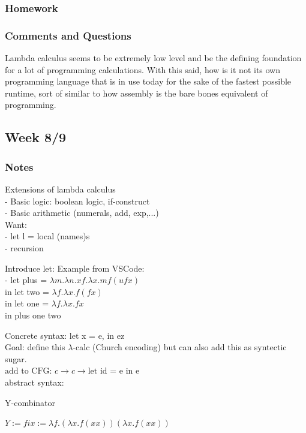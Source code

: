 \documentclass{article}
\theoremstyle{theorem}
\theoremstyle{definition}
\theoremstyle{remark}
\begin{document}
\subsubsection*{Homework}

\subsubsection*{Comments and Questions}

Lambda calculus seems to be extremely low level and be the defining foundation for a lot of programming calculations. With this said, how is it not its own programming language that is in use today for the sake of the fastest possible runtime, sort of similar to how assembly is the bare bones equivalent of programming.

\subsection{Week 8/9}

\subsubsection*{Notes}

Extensions of lambda calculus \\ 
- Basic logic: boolean logic, if-construct \\
- Basic arithmetic (numerals, add, exp,...) \\
Want: \\ 
- let l = local (names)s \\
- recursion

Introduce let:
Example from VSCode: \\
- let plus = $\lambda m . \lambda n.xf.\lambda x. m f(u f x)$ \\
  in let two = $\lambda f.\lambda x.f(fx)$ \\
  in let one = $\lambda f.\lambda x.fx$ \\
  in plus one two

Concrete syntax: let x = e, in ez \\
Goal: define this $\lambda$-calc (Church encoding)  but can also add this as syntectic sugar. \\
$\text{add to CFG: } c \rightarrow c \rightarrow \text{let id = e in e}$ \\
abstract syntax:

Y-combinator

$Y := fix := \lambda f.(\lambda x.f(xx))(\lambda x.f(xx))$
\end{document}
